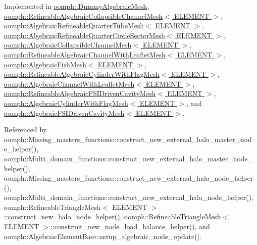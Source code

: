 Implemented in \hyperlink{classoomph_1_1DummyAlgebraicMesh_a8797e6bf088b172b5d7e1de8a2dfc326}{oomph\+::\+Dummy\+Algebraic\+Mesh}, \hyperlink{classoomph_1_1RefineableAlgebraicCollapsibleChannelMesh_a4bc2b99f24e5e5dc534fe5906d4f4e6e}{oomph\+::\+Refineable\+Algebraic\+Collapsible\+Channel\+Mesh$<$ E\+L\+E\+M\+E\+N\+T $>$}, \hyperlink{classoomph_1_1AlgebraicRefineableQuarterTubeMesh_a7ed9f4ce0442a6f962a1561318542a67}{oomph\+::\+Algebraic\+Refineable\+Quarter\+Tube\+Mesh$<$ E\+L\+E\+M\+E\+N\+T $>$}, \hyperlink{classoomph_1_1AlgebraicRefineableQuarterCircleSectorMesh_a08abc1bf64e0637fc87c36638c41b846}{oomph\+::\+Algebraic\+Refineable\+Quarter\+Circle\+Sector\+Mesh$<$ E\+L\+E\+M\+E\+N\+T $>$}, \hyperlink{classoomph_1_1AlgebraicCollapsibleChannelMesh_abad38fb50d067a126af1161a3a603972}{oomph\+::\+Algebraic\+Collapsible\+Channel\+Mesh$<$ E\+L\+E\+M\+E\+N\+T $>$}, \hyperlink{classoomph_1_1RefineableAlgebraicChannelWithLeafletMesh_a8ee7168fbb84bb87880a2590dd52eaa8}{oomph\+::\+Refineable\+Algebraic\+Channel\+With\+Leaflet\+Mesh$<$ E\+L\+E\+M\+E\+N\+T $>$}, \hyperlink{classoomph_1_1AlgebraicFishMesh_a4f992939c299f87abc762c14aab50b5c}{oomph\+::\+Algebraic\+Fish\+Mesh$<$ E\+L\+E\+M\+E\+N\+T $>$}, \hyperlink{classoomph_1_1RefineableAlgebraicCylinderWithFlagMesh_a186963cf4b1fc118929e49e012eba4d2}{oomph\+::\+Refineable\+Algebraic\+Cylinder\+With\+Flag\+Mesh$<$ E\+L\+E\+M\+E\+N\+T $>$}, \hyperlink{classoomph_1_1AlgebraicChannelWithLeafletMesh_ace3a90b4e530c75bec8301e2291151eb}{oomph\+::\+Algebraic\+Channel\+With\+Leaflet\+Mesh$<$ E\+L\+E\+M\+E\+N\+T $>$}, \hyperlink{classoomph_1_1RefineableAlgebraicFSIDrivenCavityMesh_aa68685323573763e1ded0cceed5ad14f}{oomph\+::\+Refineable\+Algebraic\+F\+S\+I\+Driven\+Cavity\+Mesh$<$ E\+L\+E\+M\+E\+N\+T $>$}, \hyperlink{classoomph_1_1AlgebraicCylinderWithFlagMesh_a9d909de1db84a3b7e42494535b152d92}{oomph\+::\+Algebraic\+Cylinder\+With\+Flag\+Mesh$<$ E\+L\+E\+M\+E\+N\+T $>$}, and \hyperlink{classoomph_1_1AlgebraicFSIDrivenCavityMesh_a87d34d6cf84c62a9049773451c664176}{oomph\+::\+Algebraic\+F\+S\+I\+Driven\+Cavity\+Mesh$<$ E\+L\+E\+M\+E\+N\+T $>$}.



Referenced by oomph\+::\+Missing\+\_\+masters\+\_\+functions\+::construct\+\_\+new\+\_\+external\+\_\+halo\+\_\+master\+\_\+node\+\_\+helper(), oomph\+::\+Multi\+\_\+domain\+\_\+functions\+::construct\+\_\+new\+\_\+external\+\_\+halo\+\_\+master\+\_\+node\+\_\+helper(), oomph\+::\+Missing\+\_\+masters\+\_\+functions\+::construct\+\_\+new\+\_\+external\+\_\+halo\+\_\+node\+\_\+helper(), oomph\+::\+Multi\+\_\+domain\+\_\+functions\+::construct\+\_\+new\+\_\+external\+\_\+halo\+\_\+node\+\_\+helper(), oomph\+::\+Refineable\+Triangle\+Mesh$<$ E\+L\+E\+M\+E\+N\+T $>$\+::construct\+\_\+new\+\_\+halo\+\_\+node\+\_\+helper(), oomph\+::\+Refineable\+Triangle\+Mesh$<$ E\+L\+E\+M\+E\+N\+T $>$\+::construct\+\_\+new\+\_\+node\+\_\+load\+\_\+balance\+\_\+helper(), and oomph\+::\+Algebraic\+Element\+Base\+::setup\+\_\+algebraic\+\_\+node\+\_\+update().



